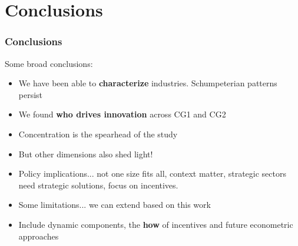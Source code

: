 \documentclass{beamer}
\begin{document}
\section{Conclusions}
	\begin{frame}[allowframebreaks]
		\frametitle{Conclusions}
		Some broad conclusions:
		\begin{itemize}
			\item We have been able to \textbf{characterize} industries. Schumpeterian patterns persist
			\item We found \textbf{who drives innovation} across CG1 and CG2
			\item Concentration is the spearhead of the study
			\item But other dimensions also shed light!
			\item Policy implications... not one size fits all, context matter, strategic sectors need strategic solutions, focus on incentives.
			\framebreak
			\item Some limitations... we can extend based on this work
			\item Include dynamic components, the \textbf{how} of incentives and future econometric approaches
		\end{itemize}
	\end{frame}
\end{document}
